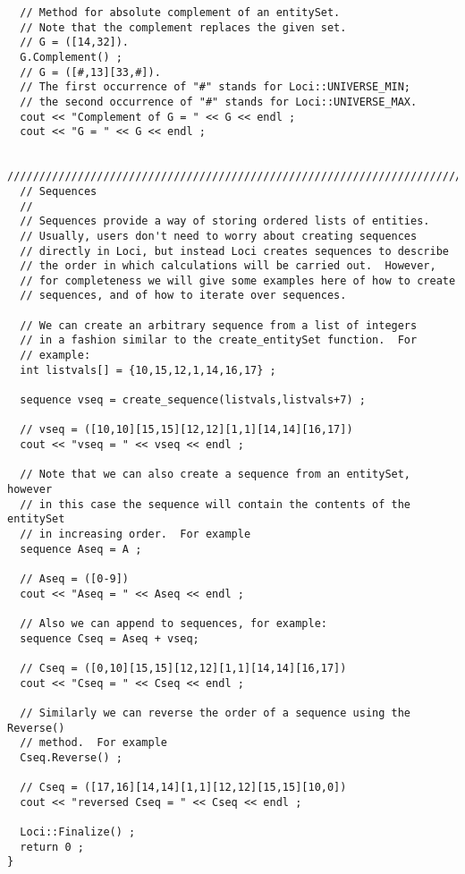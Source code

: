 \begin{verbatim}
  // Method for absolute complement of an entitySet.
  // Note that the complement replaces the given set.
  // G = ([14,32]).
  G.Complement() ;
  // G = ([#,13][33,#]).
  // The first occurrence of "#" stands for Loci::UNIVERSE_MIN;
  // the second occurrence of "#" stands for Loci::UNIVERSE_MAX.
  cout << "Complement of G = " << G << endl ; 
  cout << "G = " << G << endl ; 

  ////////////////////////////////////////////////////////////////////////////
  // Sequences
  //
  // Sequences provide a way of storing ordered lists of entities.
  // Usually, users don't need to worry about creating sequences
  // directly in Loci, but instead Loci creates sequences to describe
  // the order in which calculations will be carried out.  However,
  // for completeness we will give some examples here of how to create
  // sequences, and of how to iterate over sequences.

  // We can create an arbitrary sequence from a list of integers
  // in a fashion similar to the create_entitySet function.  For
  // example:
  int listvals[] = {10,15,12,1,14,16,17} ;
  
  sequence vseq = create_sequence(listvals,listvals+7) ;

  // vseq = ([10,10][15,15][12,12][1,1][14,14][16,17])
  cout << "vseq = " << vseq << endl ;

  // Note that we can also create a sequence from an entitySet, however
  // in this case the sequence will contain the contents of the entitySet
  // in increasing order.  For example
  sequence Aseq = A ;

  // Aseq = ([0-9])
  cout << "Aseq = " << Aseq << endl ;

  // Also we can append to sequences, for example:
  sequence Cseq = Aseq + vseq;

  // Cseq = ([0,10][15,15][12,12][1,1][14,14][16,17])
  cout << "Cseq = " << Cseq << endl ;

  // Similarly we can reverse the order of a sequence using the Reverse()
  // method.  For example
  Cseq.Reverse() ;

  // Cseq = ([17,16][14,14][1,1][12,12][15,15][10,0])
  cout << "reversed Cseq = " << Cseq << endl ;

  Loci::Finalize() ;
  return 0 ;
}
\end{verbatim}
